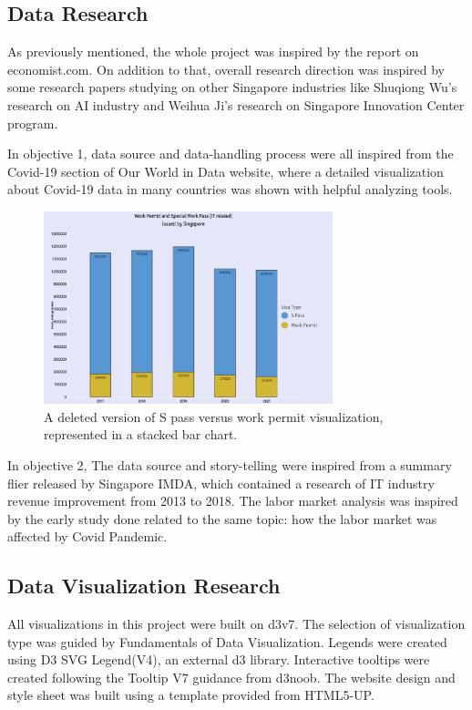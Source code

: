 \documentclass[conference]{IEEEtran}
\begin{document}
\subsection{Data Research}
As previously mentioned, the whole project was inspired by the report on economist.com\cite{economist}. On addition to that, overall research direction was inspired by some research papers studying on other Singapore industries like Shuqiong Wu’s research on AI industry\cite{ai} and Weihua Ji’s research on Singapore Innovation Center program\cite{innovation}.

In objective 1, data source and data-handling process were all inspired from the Covid-19 section of Our World in Data website\cite{ourworld}, where a detailed visualization about Covid-19 data in many countries was shown with helpful analyzing tools.

\begin{figure}[!t]
\centering
\includegraphics[width=3.3in]{1}
\caption{A deleted version of S pass versus work permit visualization, represented in a stacked bar chart.}
\label{fig:1}
\end{figure}


In objective 2, The data source and story-telling were inspired from a summary flier released by Singapore IMDA\cite{imda_flyer}, which contained a research of IT industry revenue improvement from 2013 to 2018. The labor market analysis was inspired by the early study done related to the same topic: how the labor market was affected by Covid Pandemic\cite{labor_market}.

\subsection{Data Visualization Research}
All visualizations in this project were built on d3v7\cite{d3}. The selection of visualization type was guided by Fundamentals of Data Visualization\cite{fundamentals}. Legends were created using D3 SVG Legend(V4)\cite{d3legend}, an external d3 library. Interactive tooltips were created following the Tooltip V7 guidance from d3noob\cite{d3noob}. The website design and style sheet was built using a template provided from HTML5-UP\cite{html5}.
\end{document}
